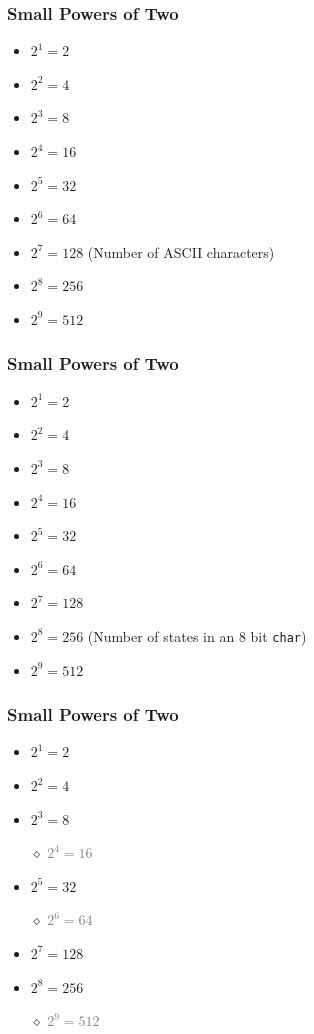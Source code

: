 \documentclass[aspectratio=43]{beamer}
\begin{document}
\begin{frame}[fragile]

  \frametitle{Small Powers of Two}

  \begin{itemize}
    \item $2^1 = 2$
    \item $2^2 = 4$
    \item $2^3 = 8$
    \item $2^4 = 16$
    \item $2^5 = 32$
    \item $2^6 = 64$
    \item $2^7 = 128$ (Number of ASCII characters)
    \item $2^8 = 256$
    \item $2^9 = 512$
  \end{itemize}

\end{frame}


\begin{frame}[fragile]

  \frametitle{Small Powers of Two}

  \begin{itemize}
    \item $2^1 = 2$
    \item $2^2 = 4$
    \item $2^3 = 8$
    \item $2^4 = 16$
    \item $2^5 = 32$
    \item $2^6 = 64$
    \item $2^7 = 128$
    \item $2^8 = 256$ (Number of states in an 8 bit \texttt{char})
    \item $2^9 = 512$
  \end{itemize}

\end{frame}


\begin{frame}[fragile]

  \frametitle{Small Powers of Two}

  \begin{itemize}
    \item $2^1 = 2$
    \item $2^2 = 4$
    \item $2^3 = 8$
    \item[$\diamond$] \textcolor{gray}{$2^4 = 16$}
    \item $2^5 = 32$
    \item[$\diamond$] \textcolor{gray}{$2^6 = 64$}
    \item $2^7 = 128$
    \item $2^8 = 256$
    \item[$\diamond$] \textcolor{gray}{$2^9 = 512$}
  \end{itemize}

\end{frame}
\end{document}
